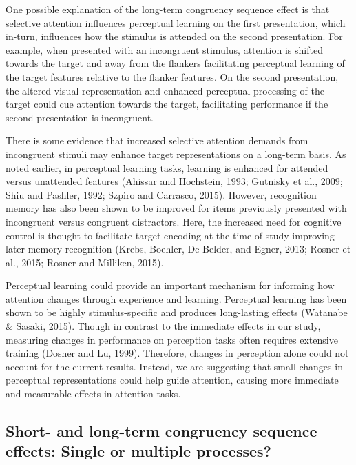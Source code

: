 \documentclass[]{DissertateCUNY}
\begin{document}
One possible explanation of the long-term congruency sequence effect is
that selective attention influences perceptual learning on the first
presentation, which in-turn, influences how the stimulus is attended on
the second presentation. For example, when presented with an incongruent
stimulus, attention is shifted towards the target and away from the
flankers facilitating perceptual learning of the target features
relative to the flanker features. On the second presentation, the
altered visual representation and enhanced perceptual processing of the
target could cue attention towards the target, facilitating performance
if the second presentation is incongruent.

There is some evidence that increased selective attention demands from
incongruent stimuli may enhance target representations on a long-term
basis. As noted earlier, in perceptual learning tasks, learning is
enhanced for attended versus unattended features (Ahissar and Hochstein,
1993; Gutnisky et al., 2009; Shiu and Pashler, 1992; Szpiro and
Carrasco, 2015). However, recognition memory has also been shown to be
improved for items previously presented with incongruent versus
congruent distractors. Here, the increased need for cognitive control is
thought to facilitate target encoding at the time of study improving
later memory recognition (Krebs, Boehler, De Belder, and Egner, 2013;
Rosner et al., 2015; Rosner and Milliken, 2015).

Perceptual learning could provide an important mechanism for informing
how attention changes through experience and learning. Perceptual
learning has been shown to be highly stimulus-specific and produces
long-lasting effects (Watanabe \& Sasaki, 2015). Though in contrast to
the immediate effects in our study, measuring changes in performance on
perception tasks often requires extensive training (Dosher and Lu,
1999). Therefore, changes in perception alone could not account for the
current results. Instead, we are suggesting that small changes in
perceptual representations could help guide attention, causing more
immediate and measurable effects in attention tasks.

\hypertarget{short--and-long-term-congruency-sequence-effects-single-or-multiple-processes}{%
\subsection{Short- and long-term congruency sequence effects: Single or
multiple
processes?}\label{short--and-long-term-congruency-sequence-effects-single-or-multiple-processes}}
\end{document}
